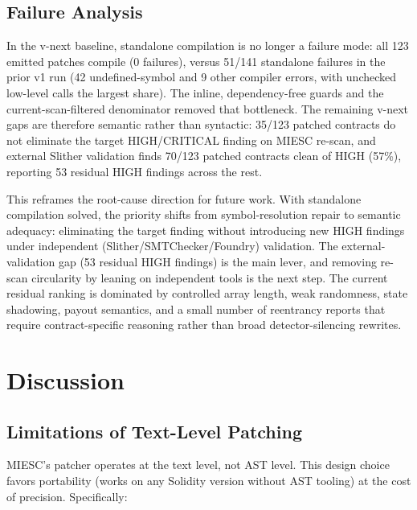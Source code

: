 \documentclass[conference]{IEEEtran}
\begin{document}
\subsection{Failure Analysis}

In the v-next baseline, standalone compilation is no longer a failure mode: all 123 emitted patches compile (0 failures), versus 51/141 standalone failures in the prior v1 run (42 undefined-symbol and 9 other compiler errors, with unchecked low-level calls the largest share). The inline, dependency-free guards and the current-scan-filtered denominator removed that bottleneck. The remaining v-next gaps are therefore semantic rather than syntactic: 35/123 patched contracts do not eliminate the target HIGH/CRITICAL finding on MIESC re-scan, and external Slither validation finds 70/123 patched contracts clean of HIGH (57\%), reporting 53 residual HIGH findings across the rest.

This reframes the root-cause direction for future work. With standalone compilation solved, the priority shifts from symbol-resolution repair to semantic adequacy: eliminating the target finding without introducing new HIGH findings under independent (Slither/SMTChecker/Foundry) validation. The external-validation gap (53 residual HIGH findings) is the main lever, and removing re-scan circularity by leaning on independent tools is the next step. The current residual ranking is dominated by controlled array length, weak randomness, state shadowing, payout semantics, and a small number of reentrancy reports that require contract-specific reasoning rather than broad detector-silencing rewrites.

\section{Discussion}

\subsection{Limitations of Text-Level Patching}

MIESC's patcher operates at the text level, not AST level. This design choice favors portability (works on any Solidity version without AST tooling) at the cost of precision. Specifically:
\end{document}
